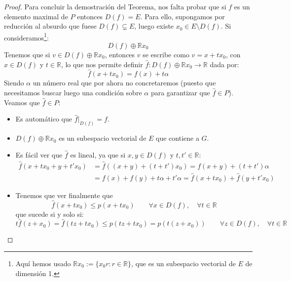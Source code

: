 \begin{teo}
\begin{proof}
        \noindent
        Para concluir la demostración del Teorema, nos falta probar que si $f$ es un elemento maximal de $P$ entonces $D(f) = E$. Para ello, supongamos por reducción al absurdo que fuese $D(f)\subsetneq E$, luego existe $x_0\in E\setminus D(f)$. Si consideramos\footnote{Aquí hemos usado $\mathbb{R} x_0:= \{x_0 r : r\in \mathbb{R}\}$, que es un subespacio vectorial de $E$ de dimensión 1.}:
        \begin{equation*}
            D(f) \oplus \mathbb{R}x_0
        \end{equation*}
        Tenemos que si $v\in D(f)\oplus \mathbb{R}x_0$, entonces $v$ se escribe como $v = x+tx_0$, con $x\in D(f)$ y $t\in \mathbb{R}$, lo que nos permite definir $\hat{f}:D(f)\oplus \mathbb{R}x_0\to \mathbb{R}$ dada por:
        \begin{equation*}
            \hat{f}(x+tx_0) = f(x) + t\alpha
        \end{equation*}
        Siendo $\alpha$ un número real que por ahora no concretaremos (puesto que necesitamos buscar luego una condición sobre $\alpha$ para garantizar que $\hat{f}\in P$). Veamos que $\hat{f} \in P$:
        \begin{itemize}
            \item Es automático que $\hat{f}\big|_{D(f)} = f$.
            \item $D(f)\oplus \mathbb{R}x_0$ es un subespacio vectorial de $E$ que contiene a $G$.
            \item Es fácil ver que $\hat{f}$ es lineal, ya que si $x,y\in D(f)$ y $t,t'\in \mathbb{R}$:
                \begin{align*}
                    \hat{f}(x+tx_0 + y+t'x_0) &= \hat{f}((x+y) + (t+t')x_0) = f(x+y) + (t+t')\alpha \\
                                              &= f(x) + f(y) + t\alpha + t'\alpha = \hat{f}(x+tx_0) + \hat{f}(y+t'x_0)
                \end{align*}
            \item Tenemos que ver finalmente que 
                \begin{equation}\label{eq:fgorromenorp}
                    \hat{f}(x+tx_0) \leq p(x+tx_0)\qquad \forall x\in D(f),\quad  \forall t\in \mathbb{R}
                \end{equation}
                que sucede si y solo si:
                \begin{equation*}
                    t\hat{f}(z+x_0) = \hat{f}(tz+tx_0) \leq p(tz+tx_0) = p(t(z+x_0)) \qquad \forall z\in D(f), \quad \forall t\in \mathbb{R}

\end{equation*}
\end{itemize}
\end{proof}
\end{teo}
